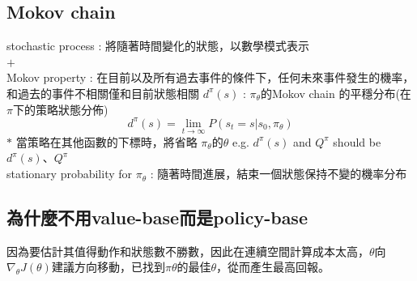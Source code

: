 \documentclass[14pt,a4paper]{report}  %
\begin{document}
\subsection{Mokov chain}
stochastic process : 將隨著時間變化的狀態，以數學模式表示\\[5pt]
$+$\\[5pt]
Mokov property : 在目前以及所有過去事件的條件下，任何未來事件發生的機率，和過去的事件不相關僅和目前狀態相關
$d^\pi(s)$ : $\pi_\theta$的Mokov chain 的平穩分布(在$\pi$下的策略狀態分佈) $$d^\pi(s) = \lim_{t \to \infty} P(s_t = s \vert s_0, \pi_\theta)$$
$\ast$ 當策略在其他函數的下標時，將省略 $\pi_\theta$的$\theta$  e.g. $d^\pi(s)$ and $Q^\pi$ should be 
$d^\pi(s)$、$Q^\pi$\\[5pt]
stationary probability for $\pi_\theta$ : 隨著時間進展，結束一個狀態保持不變的機率分布\\
\subsection{為什麼不用value-base而是policy-base}
因為要估計其值得動作和狀態數不勝數，因此在連續空間計算成本太高，$\theta$向$\nabla_\theta J(\theta)$建議方向移動，已找到$\pi\theta$的最佳$\theta$，從而產生最高回報。
\end{document}

